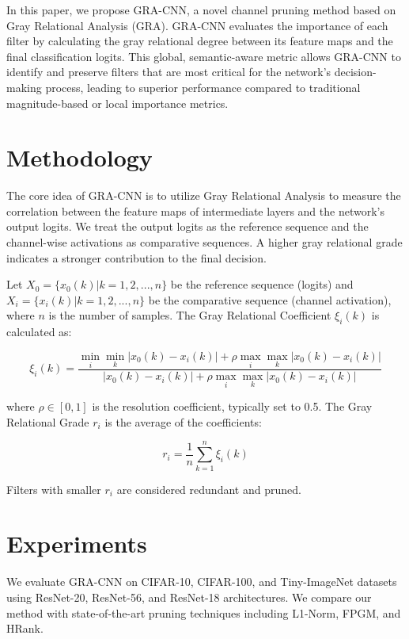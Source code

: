 \documentclass[authoryear,preprint,review,12pt]{elsarticle}
\begin{document}
In this paper, we propose GRA-CNN, a novel channel pruning method based on Gray Relational Analysis (GRA). GRA-CNN evaluates the importance of each filter by calculating the gray relational degree between its feature maps and the final classification logits. This global, semantic-aware metric allows GRA-CNN to identify and preserve filters that are most critical for the network's decision-making process, leading to superior performance compared to traditional magnitude-based or local importance metrics.



\section{Methodology}
The core idea of GRA-CNN is to utilize Gray Relational Analysis to measure the correlation between the feature maps of intermediate layers and the network's output logits. We treat the output logits as the reference sequence and the channel-wise activations as comparative sequences. A higher gray relational grade indicates a stronger contribution to the final decision.

Let $X_0 = \{x_0(k) | k = 1, 2, ..., n\}$ be the reference sequence (logits) and $X_i = \{x_i(k) | k = 1, 2, ..., n\}$ be the comparative sequence (channel activation), where $n$ is the number of samples. The Gray Relational Coefficient $\xi_i(k)$ is calculated as:

\begin{equation}
\xi_i(k) = \frac{\min_i \min_k |x_0(k) - x_i(k)| + \rho \max_i \max_k |x_0(k) - x_i(k)|}{|x_0(k) - x_i(k)| + \rho \max_i \max_k |x_0(k) - x_i(k)|}
\end{equation}

where $\rho \in [0, 1]$ is the resolution coefficient, typically set to 0.5. The Gray Relational Grade $r_i$ is the average of the coefficients:

\begin{equation}
r_i = \frac{1}{n} \sum_{k=1}^{n} \xi_i(k)
\end{equation}

Filters with smaller $r_i$ are considered redundant and pruned.

\section{Experiments}
We evaluate GRA-CNN on CIFAR-10, CIFAR-100, and Tiny-ImageNet datasets using ResNet-20, ResNet-56, and ResNet-18 architectures. We compare our method with state-of-the-art pruning techniques including L1-Norm, FPGM, and HRank.
\end{document}
